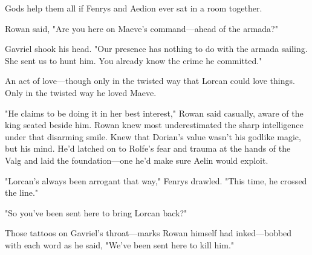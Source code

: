 Gods help them all if Fenrys and Aedion ever sat in a room together.

Rowan said, "Are you here on Maeve's command---ahead of the armada?"

Gavriel shook his head.
"Our presence has nothing to do with the armada sailing.
She sent us to hunt him.
You already know the crime he committed."

An act of love---though only in the twisted way that Lorcan could love things.
Only in the twisted way he loved Maeve.

"He claims to be doing it in her best interest," Rowan said casually, aware of the king seated beside him.
Rowan knew most underestimated the sharp intelligence under that disarming smile.
Knew that Dorian's value wasn't his godlike magic, but his mind.
He'd latched on to Rolfe's fear and trauma at the hands of the Valg and laid the foundation---one he'd make sure Aelin would exploit.

"Lorcan's always been arrogant that way," Fenrys drawled.
"This time, he crossed the line."

"So you've been sent here to bring Lorcan back?"

Those tattoos on Gavriel's throat---marks Rowan himself had inked---bobbed with each word as he said, "We've been sent here to kill him."
